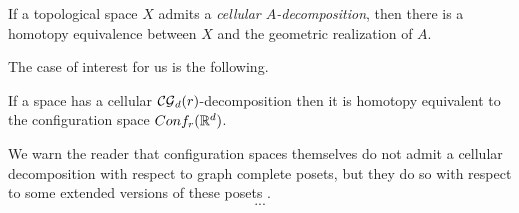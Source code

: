 \begin{proposition}
	If a topological space $X$ admits a \textit{cellular $A$-decomposition}, then there is a homotopy equivalence between $X$ and the geometric realization of $A$.
\end{proposition}

The case of interest for us is the following.

\begin{proposition}\label{p:berger}
	If a space has a cellular $\mathcal{CG}_d(r)$-decomposition then it is homotopy equivalent to
	the configuration space
	$Conf_{r}(\mathbb{R}^{d})$.
\end{proposition}

We warn the reader that configuration spaces themselves do not admit a cellular decomposition with respect to graph complete posets, but they do so with respect to some extended versions of these posets \cite{beuckelmann2021master}.
\begin{equation}\label{eq:extended complete graph map}
	...
\end{equation}

